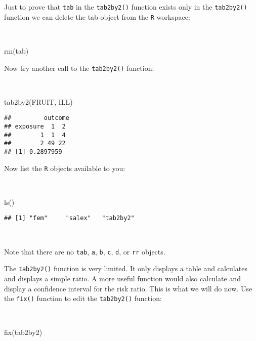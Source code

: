 \documentclass[
  12pt,
  a4paper]{book}
\newenvironment{Shaded}{\begin{snugshade}}{\end{snugshade}}
\newcommand{\FunctionTok}[1]{\textcolor[rgb]{0.00,0.00,0.00}{#1}}
\newcommand{\NormalTok}[1]{#1}
\begin{document}
Just to prove that \texttt{tab} in the \texttt{tab2by2()} function exists only in the \texttt{tab2by2()} function we can delete the tab object from the \texttt{R} workspace:

~

\begin{Shaded}
\begin{Highlighting}[]
\FunctionTok{rm}\NormalTok{(tab)}
\end{Highlighting}
\end{Shaded}

Now try another call to the \texttt{tab2by2()} function:

~

\begin{Shaded}
\begin{Highlighting}[]
\FunctionTok{tab2by2}\NormalTok{(FRUIT, ILL)}
\end{Highlighting}
\end{Shaded}

\begin{verbatim}
##         outcome
## exposure  1  2
##        1  1  4
##        2 49 22
## [1] 0.2897959
\end{verbatim}

\newpage

Now list the \texttt{R} objects available to you:

~

\begin{Shaded}
\begin{Highlighting}[]
\FunctionTok{ls}\NormalTok{()}
\end{Highlighting}
\end{Shaded}

\begin{verbatim}
## [1] "fem"     "salex"   "tab2by2"
\end{verbatim}

~

Note that there are no \texttt{tab}, \texttt{a}, \texttt{b}, \texttt{c}, \texttt{d}, or \texttt{rr} objects.

The \texttt{tab2by2()} function is very limited. It only displays a table and calculates and displays a simple ratio. A more useful function would also calculate and display a confidence interval for the risk ratio. This is what we will do now. Use the \texttt{fix()} function to edit the \texttt{tab2by2()} function:

~

\begin{Shaded}
\begin{Highlighting}[]
\FunctionTok{fix}\NormalTok{(tab2by2)}
\end{Highlighting}
\end{Shaded}
\end{document}
